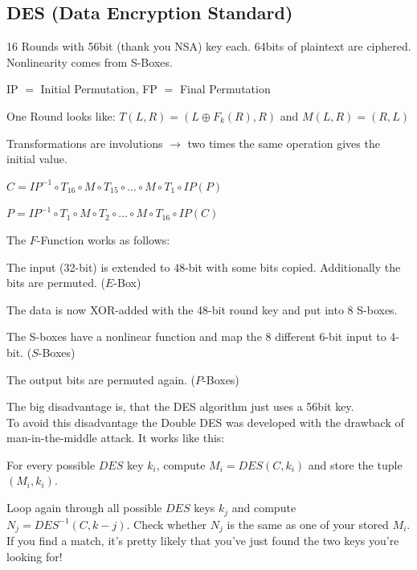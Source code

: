 \subsection{DES (Data Encryption Standard)}
\begin{minipage}{10cm}
\begin{liste}
\item 16 Rounds with 56bit (thank you NSA) key each. 64bits of plaintext are ciphered. Nonlinearity comes from S-Boxes.
\item IP $=$ Initial Permutation, FP $=$ Final Permutation
\item One Round looks like: $T(L,R)=(L \oplus F_k(R),R)$ and $M(L,R)=(R,L)$
\item Transformations are involutions $\to$ two times the same operation gives the initial value.
\item $C=IP^{-1} \circ T_{16} \circ M \circ T_{15} \circ \ldots \circ M \circ T_1 \circ IP(P)$
\item $P=IP^{-1} \circ T_1 \circ  M \circ T_2 \circ \ldots \circ M \circ T_{16} \circ IP(C)$
\end{liste}
The $F$-Function works as follows:
\begin{liste}
\item The input (32-bit) is extended to 48-bit with some bits copied. Additionally the bits are permuted. ($E$-Box)
\item The data is now XOR-added with the 48-bit round key and put into 8 S-boxes.
\item The S-boxes have a nonlinear function and map the 8 different 6-bit input to 4-bit. ($S$-Boxes)
\item The output bits are permuted again. ($P$-Boxes)
\end{liste}
The big disadvantage is, that the DES algorithm just uses a 56bit key.\\
To avoid this disadvantage the Double DES was developed with the drawback of man-in-the-middle attack. It works like this:
\begin{aufzaehlung}
    \item For every possible $DES$ key $k_i$, compute $M_i = DES(C,k_i)$ and store the tuple $(M_i, k_i)$.\\
    \item Loop again through all possible $DES$ keys $k_j$ and compute $N_j = DES^{-1}(C,k-j)$. Check whether $N_j$ 
    is the same as one of your stored $M_i$. If you find a match, it's pretty likely that you've just found the two keys you're looking for!\\

\end{aufzaehlung}
\end{minipage}
